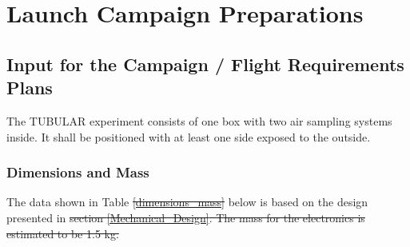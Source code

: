 \documentclass[a4paper,12pt,twoside]{article}
\providecommand{\DIFaddtex}[1]{{\protect\color{blue}\uwave{#1}}} %
\providecommand{\DIFdeltex}[1]{{\protect\color{red}\sout{#1}}}                      %
\providecommand{\DIFaddbegin}{} %
\providecommand{\DIFaddend}{} %
\providecommand{\DIFdelbegin}{} %
\providecommand{\DIFdelend}{} %
\providecommand{\DIFadd}[1]{\texorpdfstring{\DIFaddtex{#1}}{#1}} %
\providecommand{\DIFdel}[1]{\texorpdfstring{\DIFdeltex{#1}}{}} %
\newcommand{\DIFscaledelfig}{0.5}
\newlength{\DIFdelgraphicswidth} %
\newlength{\DIFdelgraphicsheight} %
\newcommand{\DIFaddincludegraphics}[2][]{{\color{blue}\fbox{\DIFOincludegraphics[#1]{#2}}}} %
\newcommand{\DIFdelincludegraphics}[2][]{%
\sbox{\DIFdelgraphicsbox}{\DIFOincludegraphics[#1]{#2}}%
\settoboxwidth{\DIFdelgraphicswidth}{\DIFdelgraphicsbox} %
\settoboxtotalheight{\DIFdelgraphicsheight}{\DIFdelgraphicsbox} %
\scalebox{\DIFscaledelfig}{%
\parbox[b]{\DIFdelgraphicswidth}{\usebox{\DIFdelgraphicsbox}\\[-\baselineskip] \rule{\DIFdelgraphicswidth}{0em}}\llap{\resizebox{\DIFdelgraphicswidth}{\DIFdelgraphicsheight}{%
\setlength{\unitlength}{\DIFdelgraphicswidth}%
\begin{picture}(1,1)%
\thicklines\linethickness{2pt} %
{\color[rgb]{1,0,0}\put(0,0){\framebox(1,1){}}}%
{\color[rgb]{1,0,0}\put(0,0){\line( 1,1){1}}}%
{\color[rgb]{1,0,0}\put(0,1){\line(1,-1){1}}}%
\end{picture}%
}\hspace*{3pt}}} %
} %
\DeclareRobustCommand{\DIFaddbegin}{\DIFOaddbegin \let\includegraphics\DIFaddincludegraphics} %
\DeclareRobustCommand{\DIFaddend}{\DIFOaddend \let\includegraphics\DIFOincludegraphics} %
\DeclareRobustCommand{\DIFdelbegin}{\DIFOdelbegin \let\includegraphics\DIFdelincludegraphics} %
\DeclareRobustCommand{\DIFdelend}{\DIFOaddend \let\includegraphics\DIFOincludegraphics} %
\begin{document}

\DIFaddend \pagebreak
\section{Launch Campaign Preparations}
\subsection{Input for the Campaign / Flight Requirements Plans}

The TUBULAR experiment consists of one box with two air sampling systems inside. It shall be positioned with at least one side exposed to the outside.

\subsubsection{Dimensions and Mass}

The data shown in Table \DIFdelbegin \DIFdel{\ref{dimensions_mass} }\DIFdelend \DIFaddbegin \DIFadd{\ref{tab:dim-mass-tab} }\DIFaddend below is based on the design presented in \DIFdelbegin \DIFdel{section \ref{Mechanical_Design}. The mass for the electronics is estimated to be 1.5 kg.  
}\DIFdelend \DIFaddbegin \DIFadd{Section \ref{Mechanical_Design}. %
}\DIFaddend 
\end{document}
